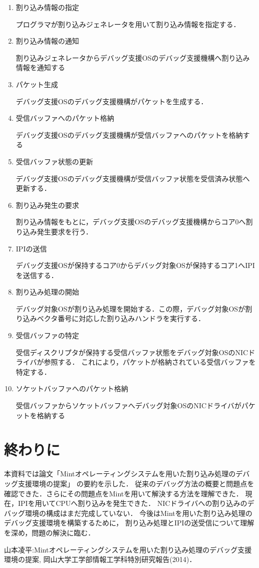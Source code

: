 \documentclass[12pt]{jsarticle}
\begin{document}
\begin{enumerate}
\item 割り込み情報の指定

プログラマが割り込みジェネレータを用いて割り込み情報を指定する．
\item 割り込み情報の通知

割り込みジェネレータからデバッグ支援OSのデバッグ支援機構へ割り込み情報を通知する
\item パケット生成

デバッグ支援OSのデバッグ支援機構がパケットを生成する．
\item 受信バッファへのパケット格納

デバッグ支援OSのデバッグ支援機構が受信バッファへのパケットを格納する
\item 受信バッファ状態の更新

デバッグ支援OSのデバッグ支援機構が受信バッファ状態を受信済み状態へ更新する．
\item 割り込み発生の要求

割り込み情報をもとに，デバッグ支援OSのデバッグ支援機構からコア0へ割り込み発生要求を行う．
\item IPIの送信

デバッグ支援OSが保持するコア0からデバッグ対象OSが保持するコア1へIPIを送信する．
\item 割り込み処理の開始

デバッグ対象OSが割り込み処理を開始する．この際，デバッグ対象OSが割り込みベクタ番号に対応した割り込みハンドラを実行する．
\item 受信バッファの特定

受信ディスクリプタが保持する受信バッファ状態をデバッグ対象OSのNICドライバが参照する．
これにより，パケットが格納されている受信バッファを特定する．
\item ソケットバッファへのパケット格納

受信バッファからソケットバッファへデバッグ対象OSのNICドライバがパケットを格納する
\end{enumerate}
\section{終わりに}
本資料では論文「Mintオペレーティングシステムを用いた割り込み処理のデバッグ支援環境の提案」
の要約を示した．
従来のデバッグ方法の概要と問題点を確認できた．さらにその問題点をMintを用いて解決する方法を理解できた．
現在，IPIを用いてCPUへ割り込みを発生できた．
NICドライバへの割り込みのデバッグ環境の構成はまだ完成していない．
今後はMintを用いた割り込み処理のデバッグ支援環境を構築するために，
割り込み処理とIPIの送受信について理解を深め，問題の解決に臨む．


\begin{thebibliography}{9}
 山本凌平:Mintオペレーティングシステムを用いた割り込み処理のデバッグ支援環境の提案,
岡山大学工学部情報工学科特別研究報告(2014)．
\end{thebibliography}
\end{document}
